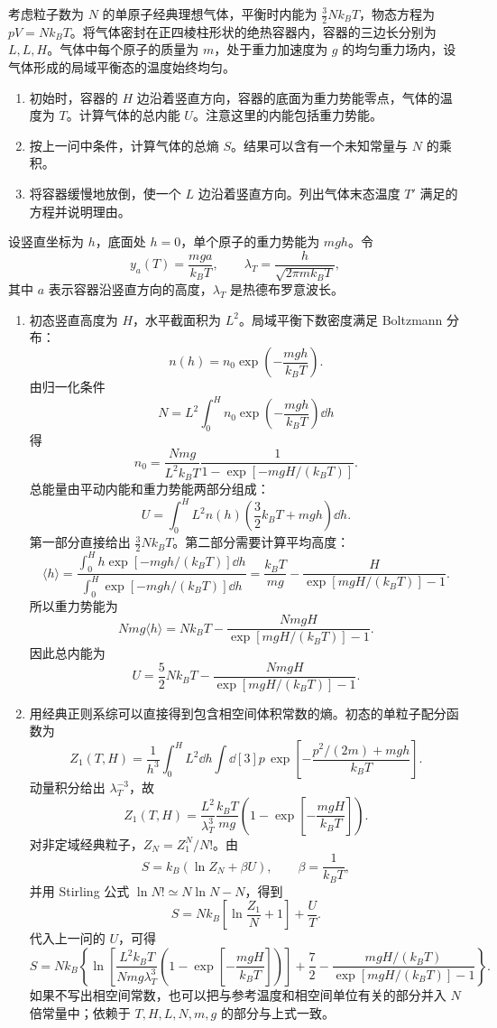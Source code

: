 \begin{question}[25 分]
考虑粒子数为 $N$ 的单原子经典理想气体，平衡时内能为 $\frac{3}{2}Nk_BT$，物态方程为 $pV=Nk_BT$。将气体密封在正四棱柱形状的绝热容器内，容器的三边长分别为 $L,L,H$。气体中每个原子的质量为 $m$，处于重力加速度为 $g$ 的均匀重力场内，设气体形成的局域平衡态的温度始终均匀。
\begin{enumerate}
    \item 初始时，容器的 $H$ 边沿着竖直方向，容器的底面为重力势能零点，气体的温度为 $T$。计算气体的总内能 $U$。注意这里的内能包括重力势能。
    \item 按上一问中条件，计算气体的总熵 $S$。结果可以含有一个未知常量与 $N$ 的乘积。
    \item 将容器缓慢地放倒，使一个 $L$ 边沿着竖直方向。列出气体末态温度 $T'$ 满足的方程并说明理由。
\end{enumerate}
\begin{solution}
设竖直坐标为 $h$，底面处 $h=0$，单个原子的重力势能为 $mgh$。令
\[
    y_a(T)=\frac{mga}{k_BT},
    \qquad
    \lambda_T=\frac{h}{\sqrt{2\pi mk_BT}},
\]
其中 $a$ 表示容器沿竖直方向的高度，$\lambda_T$ 是热德布罗意波长。
\begin{enumerate}
    \item 初态竖直高度为 $H$，水平截面积为 $L^2$。局域平衡下数密度满足 Boltzmann 分布：
    \[
        n(h)=n_0\exp\left(-\frac{mgh}{k_BT}\right).
    \]
    由归一化条件
    \[
        N=L^2\int_0^H n_0\exp\left(-\frac{mgh}{k_BT}\right)\dd{h}
    \]
    得
    \[
        n_0=\frac{Nmg}{L^2k_BT}\frac{1}{1-\exp[-mgH/(k_BT)]}.
    \]
    总能量由平动内能和重力势能两部分组成：
    \[
        U=\int_0^HL^2n(h)\left(\frac{3}{2}k_BT+mgh\right)\dd{h}.
    \]
    第一部分直接给出 $\frac{3}{2}Nk_BT$。第二部分需要计算平均高度：
    \[
        \langle h\rangle
        =\frac{\int_0^Hh\exp[-mgh/(k_BT)]\dd{h}}{\int_0^H\exp[-mgh/(k_BT)]\dd{h}}
        =\frac{k_BT}{mg}-\frac{H}{\exp[mgH/(k_BT)]-1}.
    \]
    所以重力势能为
    \[
        Nmg\langle h\rangle
        =Nk_BT-\frac{NmgH}{\exp[mgH/(k_BT)]-1}.
    \]
    因此总内能为
    \[
        \boxed{U=\frac{5}{2}Nk_BT-\frac{NmgH}{\exp[mgH/(k_BT)]-1}.}
    \]

    \item 用经典正则系综可以直接得到包含相空间体积常数的熵。初态的单粒子配分函数为
    \[
        Z_1(T,H)=\frac{1}{h^3}\int_{0}^{H}L^2\dd{h}\int \dd[3]{p}\,
        \exp\left[-\frac{p^2/(2m)+mgh}{k_BT}\right].
    \]
    动量积分给出 $\lambda_T^{-3}$，故
    \[
        Z_1(T,H)=\frac{L^2}{\lambda_T^3}\frac{k_BT}{mg}
        \left(1-\exp\left[-\frac{mgH}{k_BT}\right]\right).
    \]
    对非定域经典粒子，$Z_N=Z_1^N/N!$。由
    \[
        S=k_B(\ln Z_N+\beta U),
        \qquad \beta=\frac{1}{k_BT},
    \]
    并用 Stirling 公式 $\ln N!\simeq N\ln N-N$，得到
    \[
        S=Nk_B\left[\ln\frac{Z_1}{N}+1\right]+\frac{U}{T}.
    \]
    代入上一问的 $U$，可得
    \[
        \boxed{
        S=Nk_B\left\{
        \ln\left[\frac{L^2k_BT}{Nmg\lambda_T^3}
        \left(1-\exp\left[-\frac{mgH}{k_BT}\right]\right)\right]
        +\frac{7}{2}-\frac{mgH/(k_BT)}{\exp[mgH/(k_BT)]-1}
        \right\}.}
    \]
    如果不写出相空间常数，也可以把与参考温度和相空间单位有关的部分并入 $N$ 倍常量中；依赖于 $T,H,L,N,m,g$ 的部分与上式一致。


\end{enumerate}
\end{solution}
\end{question}
